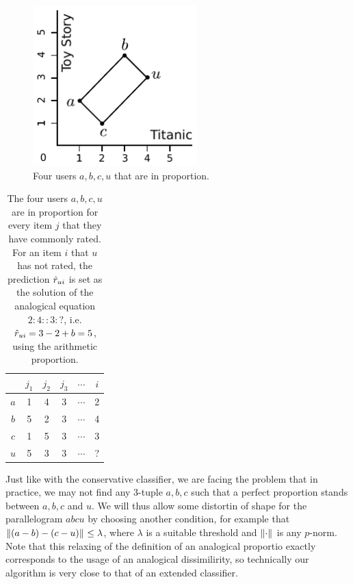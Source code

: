 \begin{figure}[!h]
\centering
  \includegraphics[width=2.5in]{figures/analogical_recommendation.pdf}
  \caption{Four users $a, b, c, u$ that are in proportion.}
\label{FIG:analogical_recommendation}
\end{figure}

\begin{table}[h!]
\centering
  \begin{tabular}{| c |  c  c  c  c  c | }
\toprule
 & $j_1$ & $j_2$ & $j_3$ & $\cdots$ & $i$\\
  \midrule
$a$ & 1 & 4  & 3 & $\cdots$ & 2 \\
$b$ & 5 & 2  & 3 & $\cdots$ & 4 \\
$c$ & 1 & 5  & 3 & $\cdots$ & 3 \\
$u$ & 5 & 3  & 3 & $\cdots$ & ? \\
\bottomrule
\end{tabular}
\caption{The four users $a, b, c, u$ are in proportion for every item $j$ that
  they have commonly rated. For an item $i$ that $u$ has not rated, the
  prediction $\hat{r}_{ui}$ is set as the solution of the analogical equation
  $2:4::3:?$, i.e. $\hat{r}_{ui} = 3 - 2 + b = 5$, using the arithmetic proportion.}
\label{TAB:analogical_recommendation}
\end{table}

Just like with the conservative classifier, we are facing the problem that in
practice, we may not find any $3$-tuple $a, b, c$ such that a perfect
proportion stands between $a, b, c$ and $u$. We will thus allow some distortin
of shape for the parallelogram $abcu$ by choosing another condition, for
example that ${\left\lVert(a-b) - (c-u)\right\rVert}_{} \leq \lambda$, where $\lambda$ is a
suitable threshold and ${\left\lVert\cdot\right\rVert}_{}$ is any $p$-norm. Note that this
relaxing of the definition of an analogical proportio exactly corresponds to
the usage of an analogical dissimilirity, so technically our algorithm is very
close to that of an extended classifier.

